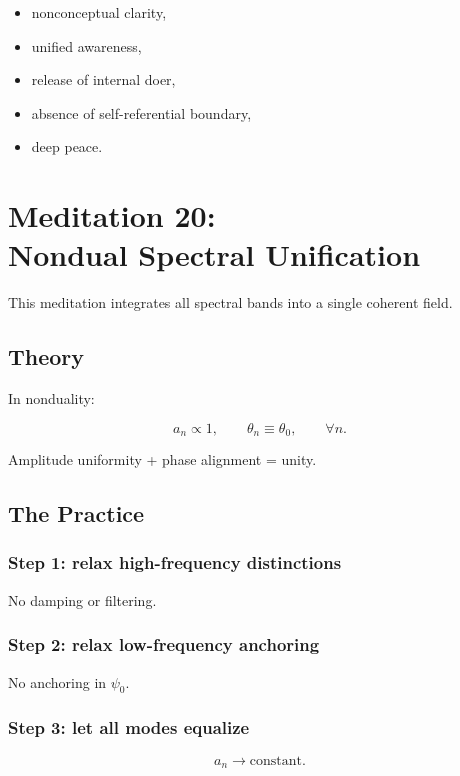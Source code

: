 \documentclass[12pt]{article}
\begin{document}
\begin{itemize}
    \item nonconceptual clarity,
    \item unified awareness,
    \item release of internal doer,
    \item absence of self-referential boundary,
    \item deep peace.
\end{itemize}

\newpage


\chapter{Meditation 20:\\ Nondual Spectral Unification}

This meditation integrates all spectral bands into a single coherent field.

\section{Theory}

In nonduality:

\[
a_n \propto 1,
\qquad
\theta_n \equiv \theta_0,
\qquad
\forall n.
\]

Amplitude uniformity + phase alignment = unity.

\section{The Practice}

\subsection*{Step 1: relax high-frequency distinctions}
No damping or filtering.

\subsection*{Step 2: relax low-frequency anchoring}
No anchoring in $\psi_0$.

\subsection*{Step 3: let all modes equalize}
\[
a_n \to \text{constant}.
\]
\end{document}
